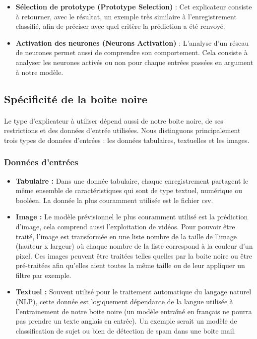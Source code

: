 \begin{itemize}
    \item \textbf{Sélection de prototype (Prototype Selection)} : Cet explicateur consiste à retourner, avec le résultat, un exemple très similaire à l'enregistrement classifié, afin de préciser avec quel critère la prédiction a été renvoyé.
    
    \item \textbf{Activation des neurones (Neurons Activation)} : L'analyse d'un réseau de neurones permet aussi de comprendre son comportement. Cela consiste à analyser les neurones activés ou non pour chaque entrées passées en argument à notre modèle.
\end{itemize}

\subsection{Spécificité de la boite noire}
\paragraph{}Le type d'explicateur à utiliser dépend aussi de notre boite noire, de ses restrictions et des données d'entrée utilisées. Nous distinguons principalement trois types de données d'entrées : les données tabulaires, textuelles et les images.

\subsubsection{Données d'entrées}
\begin{itemize}
    \item \textbf{Tabulaire :} Dans une donnée tabulaire, chaque enregistrement partagent le même ensemble de caractéristiques qui sont de type textuel, numérique ou booléen. La donnée la plus couramment utilisée est le fichier csv.
    
    \item \textbf{Image :} Le modèle prévisionnel le plus couramment utilisé est la prédiction d'image, cela comprend aussi l'exploitation de vidéos. Pour pouvoir être traité, l'image est transformée en une liste nombre de la taille de l'image (hauteur x largeur) où chaque nombre de la liste correspond à la couleur d'un pixel. Ces images peuvent être traitées telles quelles par la boite noire ou être pré-traitées afin qu'elles aient toutes la même taille ou de leur appliquer un filtre par exemple.
    
    \item \textbf{Textuel :} Souvent utilisé pour le traitement automatique du langage naturel (NLP), cette donnée est logiquement dépendante de la langue utilisée à l'entrainement de notre boite noire (un modèle entraîné en français ne pourra pas prendre un texte anglais en entrée). Un exemple serait un modèle de classification de sujet ou bien de détection de spam dans une boite mail.
\end{itemize}

